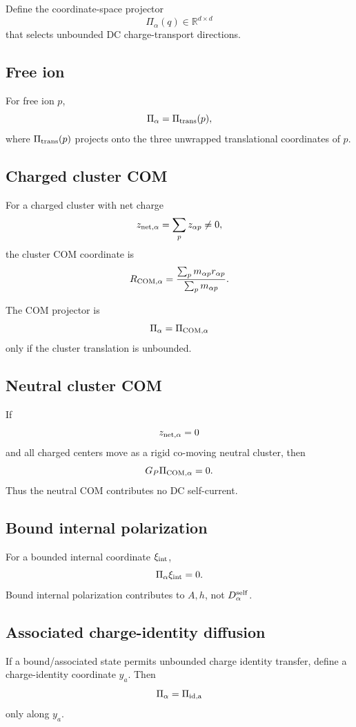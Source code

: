 Define the coordinate-space projector
\[
\Pi_\alpha(q)\in\mathbb R^{d\times d}
\]
that selects unbounded DC charge-transport directions.

\subsection{Free ion}

For free ion \(p\),
\[
\Pi_\alpha=\Pi_{\rm trans}(p),
\]
where \(\Pi_{\rm trans}(p)\) projects onto the three unwrapped translational coordinates of \(p\).

\subsection{Charged cluster COM}

For a charged cluster with net charge
\[
z_{\rm net,\alpha}=\sum_p z_{\alpha p}\ne0,
\]
the cluster COM coordinate is
\[
R_{\rm COM,\alpha}=
\frac{\sum_p m_{\alpha p}r_{\alpha p}}
{\sum_p m_{\alpha p}}.
\]

The COM projector is
\[
\Pi_\alpha=\Pi_{\rm COM,\alpha}
\]
only if the cluster translation is unbounded.

\subsection{Neutral cluster COM}

If
\[
z_{\rm net,\alpha}=0
\]
and all charged centers move as a rigid co-moving neutral cluster, then
\[
G_P\Pi_{\rm COM,\alpha}=0.
\]
Thus the neutral COM contributes no DC self-current.

\subsection{Bound internal polarization}

For a bounded internal coordinate \(\xi_{\rm int}\),
\[
\Pi_\alpha\xi_{\rm int}=0.
\]
Bound internal polarization contributes to \(A,h\), not \(D_\alpha^{\rm self}\).

\subsection{Associated charge-identity diffusion}

If a bound/associated state permits unbounded charge identity transfer,
define a charge-identity coordinate \(y_a\). Then
\[
\Pi_\alpha=\Pi_{\rm id,a}
\]
only along \(y_a\).

